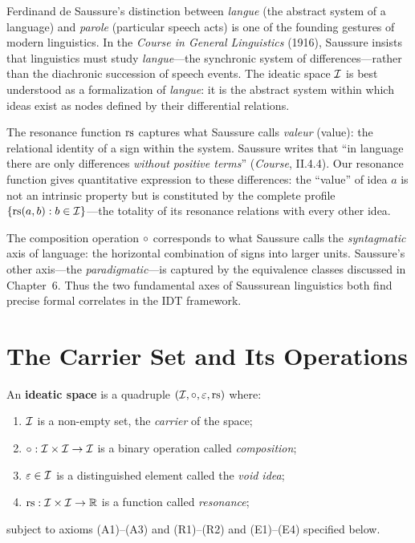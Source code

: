 \begin{interpretation}\label{interp:ch1:saussure_langue}
Ferdinand de Saussure's distinction between \emph{langue} (the abstract
system of a language) and \emph{parole} (particular speech acts) is one of
the founding gestures of modern linguistics. In the \emph{Course in General
Linguistics} (1916), Saussure insists that linguistics must study
\emph{langue}---the synchronic system of differences---rather than the
diachronic succession of speech events. The ideatic space $\mathcal{I}$ is best
understood as a formalization of \emph{langue}: it is the abstract system
within which ideas exist as nodes defined by their differential relations.

The resonance function $\mathrm{rs}$ captures what Saussure calls \emph{valeur}
(value): the relational identity of a sign within the system. Saussure
writes that ``in language there are only differences \emph{without positive
terms}'' (\emph{Course}, II.4.4). Our resonance function gives quantitative
expression to these differences: the ``value'' of idea $a$ is not an
intrinsic property but is constituted by the complete profile
$\{\mathrm{rs}(a, b) : b \in \mathcal{I}\}$---the totality of its resonance relations
with every other idea.

The composition operation $\circ$ corresponds to what Saussure calls the
\emph{syntagmatic} axis of language: the horizontal combination of signs
into larger units. Saussure's other axis---the \emph{paradigmatic}---is
captured by the equivalence classes discussed in Chapter~6. Thus the two
fundamental axes of Saussurean linguistics both find precise formal
correlates in the IDT framework.
\end{interpretation}

\section{The Carrier Set and Its Operations}

\begin{definition}
An \textbf{ideatic space} is a quadruple $(\mathcal{I}, \circ, \varepsilon, \mathrm{rs})$
where:
\begin{enumerate}
    \item $\mathcal{I}$ is a non-empty set, the \emph{carrier} of the space;
    \item $\circ : \mathcal{I} \times \mathcal{I} \to \mathcal{I}$ is a binary operation called
          \emph{composition};
    \item $\varepsilon \in \mathcal{I}$ is a distinguished element called the \emph{void
          idea};
    \item $\mathrm{rs} : \mathcal{I} \times \mathcal{I} \to \mathbb{R}$ is a function called
          \emph{resonance};
\end{enumerate}
subject to axioms (A1)--(A3) and (R1)--(R2) and (E1)--(E4) specified
below.
\end{definition}

